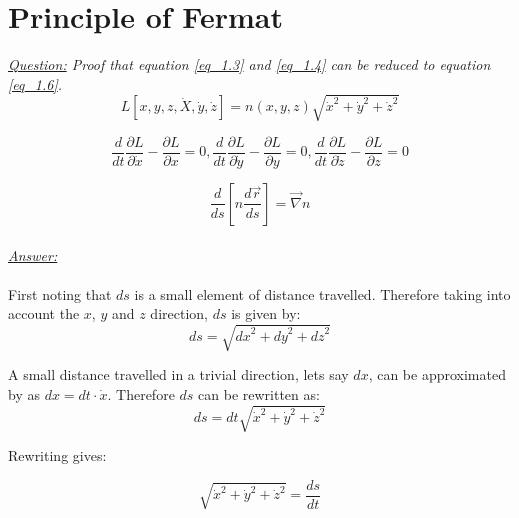 \documentclass{article}
\begin{document}
\section{Principle of Fermat}

\textit{\underline{Question:} Proof that equation \ref{eq_1.3} and \ref{eq_1.4} can be reduced to equation \ref{eq_1.6}.} \\

\begin{equation}
	\label{eq_1.3}
	L[x,y,z,\dot{X},\dot{y},\dot{z}] = n(x,y,z)\sqrt{\dot{x}^2+\dot{y}^2+\dot{z}^2}
\end{equation}

\begin{equation}
	\label{eq_1.4}
	\frac{d}{dt} \frac{\partial L}{\partial \dot{x}} - \frac{\partial L}{\partial x} = 0, \frac{d}{dt} \frac{\partial L}{\partial \dot{y}} - \frac{\partial L}{\partial y} = 0, \frac{d}{dt} \frac{\partial L}{\partial \dot{z}} - \frac{\partial L}{\partial z} = 0
\end{equation}

\begin{equation}
	\label{eq_1.6}
	\frac{d}{ds} \left[ n \frac{d \vec{r}}{ds} \right] = \vec{\nabla} n
\end{equation} \\
\textit{\underline{Answer:}}\\
\\
First noting that $ds$ is a small element of distance travelled. Therefore taking into account the $x$, $y$ and $z$ direction, $ds$ is given by: \\

\begin{equation}
	ds = \sqrt{{dx}^2+{dy}^2+{dz}^2}
\end{equation}

A small distance travelled in a trivial direction, lets say $dx$, can be approximated by as $dx = dt \cdot \dot{x}$. Therefore $ds$ can be rewritten as: \\

\begin{equation}
	ds = dt \sqrt{\dot{x}^2+\dot{y}^2+\dot{z}^2}
\end{equation}

Rewriting gives:

\begin{equation}
	\label{eq_dsdt}
	\sqrt{\dot{x}^2+\dot{y}^2+\dot{z}^2} = \frac{ds}{dt}
\end{equation}
\end{document}
